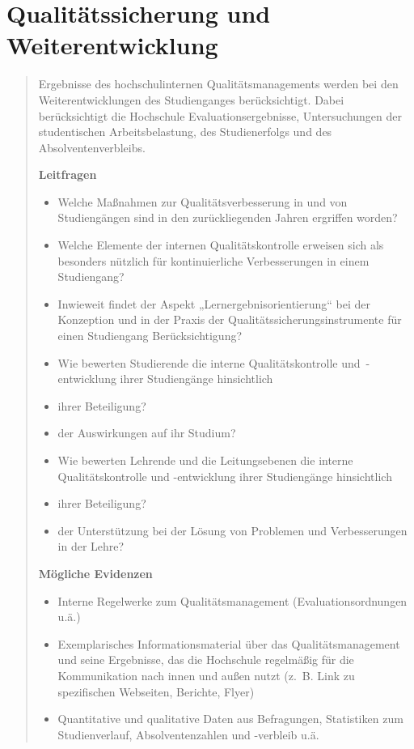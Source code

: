 \chapter{Qualitätssicherung und
Weiterentwicklung}\label{qualituxe4tssicherung-und-weiterentwicklung}

\begin{quote}
Ergebnisse des hochschulinternen Qualitätsmanagements werden bei den
Weiterentwicklungen des Studienganges berücksichtigt. Dabei
berücksichtigt die Hochschule Evaluationsergebnisse, Untersuchungen der
studentischen Arbeitsbelastung, des Studienerfolgs und des
Absolventenverbleibs.

\textbf{Leitfragen}

\begin{itemize}
\item
  Welche Maßnahmen zur Qualitätsverbesserung in und von Studiengängen
  sind in den zurückliegenden Jahren ergriffen worden?
\item
  Welche Elemente der internen Qualitätskontrolle erweisen sich als
  besonders nützlich für kontinuierliche Verbesserungen in einem
  Studiengang?
\item
  Inwieweit findet der Aspekt „Lernergebnisorientierung`` bei der
  Konzeption und in der Praxis der Qualitätssicherungsinstrumente für
  einen Studiengang Berücksichtigung?
\item
  Wie bewerten Studierende die interne Qualitätskontrolle
  und~-entwicklung ihrer Studiengänge hinsichtlich
\item
  ihrer Beteiligung?
\item
  der Auswirkungen auf ihr Studium?
\item
  Wie bewerten Lehrende und die Leitungsebenen die interne
  Qualitätskontrolle und -entwicklung ihrer Studiengänge hinsichtlich
\item
  ihrer Beteiligung?
\item
  der Unterstützung bei der Lösung von Problemen und Verbesserungen in
  der Lehre?
\end{itemize}

\textbf{Mögliche Evidenzen}

\begin{itemize}
\item
  Interne Regelwerke zum Qualitätsmanagement (Evaluationsordnungen u.ä.)
\item
  Exemplarisches Informationsmaterial über das Qualitätsmanagement und
  seine Ergebnisse, das die Hochschule regelmäßig für die Kommunikation
  nach innen und außen nutzt (z.~B. Link zu spezifischen Webseiten,
  Berichte, Flyer)
\item
  Quantitative und qualitative Daten aus Befragungen, Statistiken zum
  Studienverlauf, Absolventenzahlen und -verbleib u.ä.
\end{itemize}
\end{quote}

